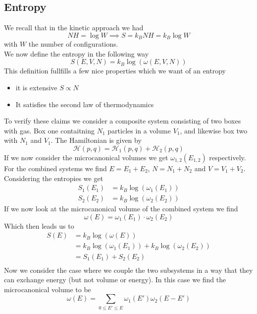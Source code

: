 \documentclass{report}
\begin{document}
\subsection{Entropy}
We recall that in the kinetic approach we had \[
N H = \log W \implies S = k_B N H = k_B \log W
\] with $W$ the number of configurations.\\
We now define the entropy in the following way \[
  S\left( E,V,N \right) = k_B \log\left( \omega\left( E,V,N \right)  \right) 
\] This definition fullfills a few nice properties which we want of an entropy
\begin{itemize}
  \item it is extensive $S \propto N$ 
  \item It satisfies the second law of thermodynamics
\end{itemize}
To verify these claims we consider a composite system consisting of two boxes with gas. Box one contaitning $N_1$ particles in a volume $V_1$, and likewise box two with $N_1$ and $V_1$. The Hamiltonian is given by \[
  \mathcal{H}\left( p,q \right) = \mathcal{H}_1\left( p,q \right) + \mathcal{H}_2\left( p,q \right) 
\] 
If we now consider the microcanonical volumes we get $\omega_{1,2}\left( E_{1,2} \right) $ respectively. For the combined systems we find $E = E_1 + E_2$, $N = N_1 + N_2$ and $V = V_1 + V_2$. Considering the entropies we get
\begin{align*}
  S_1\left( E_1 \right) &= k_B \log\left( \omega_1\left( E_1 \right)  \right)  \\
  S_2\left( E_2 \right) &= k_B \log\left( \omega_2\left( E_2 \right)  \right) 
\end{align*}
If we now look at the microcanonical volume of the combined system we find \[
  \omega\left( E \right) = \omega_1\left( E_1 \right) \cdot \omega_2\left( E_2 \right) 
\] Which then leads us to 
\begin{align*}
  S\left( E \right) &= k_B \log\left( \omega\left( E \right)  \right) \\
                    &= k_B \log\left( \omega_1\left( E_1 \right)  \right) + k_B \log\left( \omega_2\left( E_2 \right)  \right)  \\
                    &= S_1\left( E_1 \right) + S_2\left( E_2 \right)  \\
\end{align*}
Now we consider the case where we couple the two subsystems in a way that they can exchange energy (but not volume or energy). In this case we find the microcanonical volume to be \[
  \omega\left( E \right) = \sum_{0\le E' \le E} \omega_1\left( E' \right) \omega_2\left( E - E' \right) 
\] 
\end{document}
